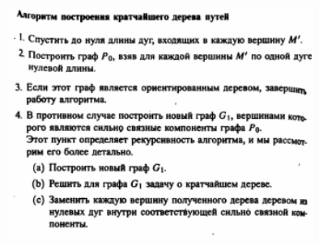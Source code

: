 \documentclass[discrete.tex]{subfiles}
\begin{document}
  \begin{figure}[H]
          \includegraphics[width=10cm]{pics/47_5}
          \centering
  \end{figure}
\end{document}
